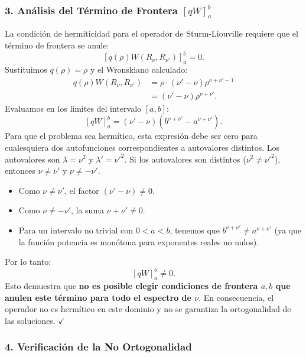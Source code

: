 \documentclass[a4paper]{article}
\begin{document}
\subsubsection{3. Análisis del Término de Frontera $[qW]_a^b$}

La condición de hermiticidad para el operador de Sturm-Liouville requiere que el término de frontera se anule:
$$
\left[ q(\rho) W(R_\nu, R_{\nu'}) \right]_a^b = 0.
$$
Sustituimos $q(\rho) = \rho$ y el Wronskiano calculado:
\begin{align}
q(\rho) W(R_\nu, R_{\nu'}) &= \rho \cdot (\nu' - \nu) \rho^{\nu+\nu'-1} \nonumber \\
&= (\nu' - \nu) \rho^{\nu+\nu'}.
\end{align}
Evaluamos en los límites del intervalo $[a, b]$:
$$
\left[ qW \right]_a^b = (\nu' - \nu) \left( b^{\nu+\nu'} - a^{\nu+\nu'} \right).
$$
Para que el problema sea hermítico, esta expresión debe ser cero para cualesquiera dos autofunciones correspondientes a autovalores distintos. Los autovalores son $\lambda = \nu^2$ y $\lambda' = \nu'^2$. Si los autovalores son distintos ($\nu^2 \neq \nu'^2$), entonces $\nu \neq \nu'$ y $\nu \neq -\nu'$.

\begin{itemize}
    \item Como $\nu \neq \nu'$, el factor $(\nu' - \nu) \neq 0$.
    \item Como $\nu \neq -\nu'$, la suma $\nu + \nu' \neq 0$.
    \item Para un intervalo no trivial con $0 < a < b$, tenemos que $b^{\nu+\nu'} \neq a^{\nu+\nu'}$ (ya que la función potencia es monótona para exponentes reales no nulos).
\end{itemize}

Por lo tanto:
$$
\left[ qW \right]_a^b \neq 0.
$$
Esto demuestra que \textbf{no es posible elegir condiciones de frontera $a, b$ que anulen este término para todo el espectro de $\nu$}. En consecuencia, el operador no es hermítico en este dominio y no se garantiza la ortogonalidad de las soluciones. $\checkmark$

\subsubsection{4. Verificación de la No Ortogonalidad}
\end{document}
